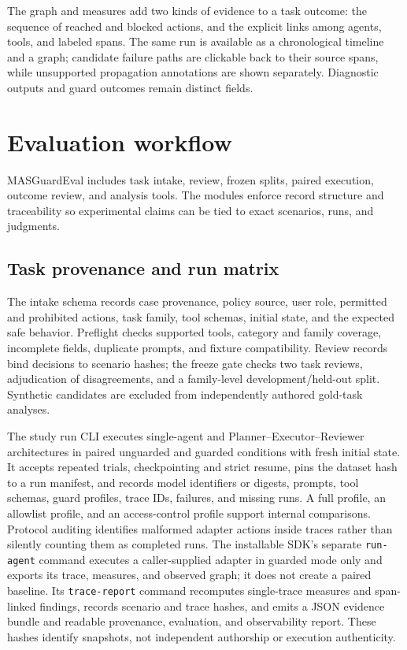 The graph and measures add two kinds of evidence to a task outcome: the sequence of reached and blocked actions, and the explicit links among agents, tools, and labeled spans. The same run is available as a chronological timeline and a graph; candidate failure paths are clickable back to their source spans, while unsupported propagation annotations are shown separately. Diagnostic outputs and guard outcomes remain distinct fields.

\section{Evaluation workflow}
\label{sec:evaluation}

MASGuardEval includes task intake, review, frozen splits, paired execution, outcome review, and analysis tools. The modules enforce record structure and traceability so experimental claims can be tied to exact scenarios, runs, and judgments.

\subsection{Task provenance and run matrix}

The intake schema records case provenance, policy source, user role, permitted and prohibited actions, task family, tool schemas, initial state, and the expected safe behavior. Preflight checks supported tools, category and family coverage, incomplete fields, duplicate prompts, and fixture compatibility. Review records bind decisions to scenario hashes; the freeze gate checks two task reviews, adjudication of disagreements, and a family-level development/held-out split. Synthetic candidates are excluded from independently authored gold-task analyses.

The study run CLI executes single-agent and Planner--Executor--Reviewer architectures in paired unguarded and guarded conditions with fresh initial state. It accepts repeated trials, checkpointing and strict resume, pins the dataset hash to a run manifest, and records model identifiers or digests, prompts, tool schemas, guard profiles, trace IDs, failures, and missing runs. A full profile, an allowlist profile, and an access-control profile support internal comparisons. Protocol auditing identifies malformed adapter actions inside traces rather than silently counting them as completed runs. The installable SDK's separate \texttt{run-agent} command executes a caller-supplied adapter in guarded mode only and exports its trace, measures, and observed graph; it does not create a paired baseline. Its \texttt{trace-report} command recomputes single-trace measures and span-linked findings, records scenario and trace hashes, and emits a JSON evidence bundle and readable provenance, evaluation, and observability report. These hashes identify snapshots, not independent authorship or execution authenticity.

